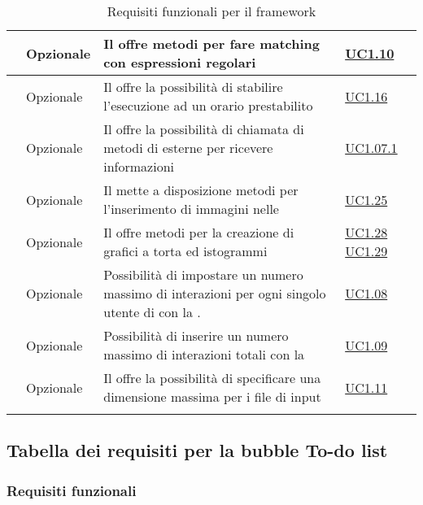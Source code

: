 \begin{longtable}{|P{1.5cm}|P{2.5cm}|P{6.5cm}|P{2.5cm}|}
	\hline \RequisitoOpF\label{L42} & Opzionale & Il  offre metodi per fare matching con espressioni regolari
	 & \hyperref[UC1.10]{UC1.10} \\
	\hline \RequisitoOpF\label{L43} & Opzionale & Il  offre la possibilità di stabilire l'esecuzione ad un orario prestabilito & \hyperref[UC1.16]{UC1.16} \\
	\hline \RequisitoOpF\label{L44} & Opzionale & Il  offre la possibilità di chiamata di metodi di  esterne per ricevere informazioni  & \hyperref[UC1.07.1]{UC1.07.1} \\
	\hline \RequisitoOpF\label{L45} & Opzionale & Il  mette a disposizione metodi per l'inserimento di immagini nelle 
	 & \hyperref[UC1.25]{UC1.25} \\
	\hline \RequisitoOpF\label{L46} & Opzionale & Il  offre metodi per la creazione di grafici a torta ed istogrammi
	 & \hyperref[UC1.28]{UC1.28} \linebreak \hyperref[UC1.29]{UC1.29}  \\	 
	 \hline \RequisitoOpF\label{L47} & Opzionale & Possibilità di impostare un numero massimo di interazioni per ogni singolo utente di  con la . & \hyperref[UC1.08]{UC1.08} \\
	 \hline \RequisitoOpF\label{L48} & Opzionale & Possibilità di inserire un numero massimo di interazioni totali con la  & \hyperref[UC1.09]{UC1.09} \\
	 \hline \RequisitoOpF\label{L49} & Opzionale & Il  offre la possibilità di specificare una dimensione massima per i file di input & \hyperref[UC1.11]{UC1.11} \\
	\hline
	\caption{Requisiti funzionali per il framework}
\end{longtable}


\subsection{Tabella dei requisiti per la bubble To-do list}

\subsubsection{Requisiti funzionali}

